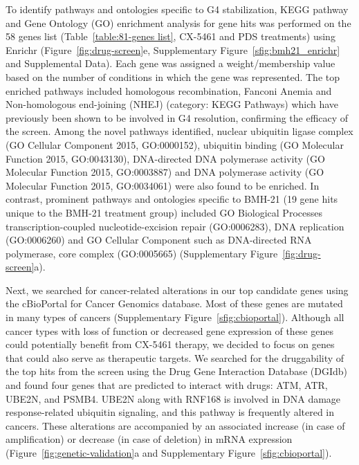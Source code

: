 To identify pathways and ontologies specific to G4 stabilization, KEGG pathway and Gene Ontology (GO) enrichment analysis for gene hits was performed on the 58 genes list (Table~\ref{table:81-genes list}, CX-5461 and PDS treatments) using Enrichr (Figure~\ref{fig:drug-screen}e, Supplementary Figure~\ref{sfig:bmh21_enrichr} and Supplemental Data)\cite{Chen2013,Kuleshov2016}. 
Each gene was assigned a weight/membership value based on the number of conditions in which the gene was represented. 
The top enriched pathways included homologous recombination, Fanconi Anemia  and Non-homologous end-joining (NHEJ) (category: KEGG Pathways) which have previously been shown to be involved in G4 resolution\cite{Sarkies2012,Piazza2010a,Paeschke2011a,Paeschke2013,Jimeno2018,Mendoza2016a,Eddy2014,Zimmer2015,Xu2017}, confirming the efficacy of the screen. 
Among the novel pathways identified, nuclear ubiquitin ligase complex (GO Cellular Component 2015, GO:0000152), ubiquitin binding (GO Molecular Function 2015, GO:0043130), DNA-directed DNA polymerase activity (GO Molecular Function 2015, GO:0003887) and DNA polymerase activity (GO Molecular Function 2015, GO:0034061) were also found to be enriched.
In contrast, prominent pathways and ontologies specific to BMH-21 (19 gene hits unique to the BMH-21 treatment group) included GO Biological Processes transcription-coupled nucleotide-excision repair (GO:0006283), DNA replication (GO:0006260) and GO Cellular Component such as DNA-directed RNA polymerase, core complex (GO:0005665) (Supplementary Figure~\ref{fig:drug-screen}a). 

Next, we searched for cancer-related alterations in our top candidate genes using the cBioPortal for Cancer Genomics database\cite{Cerami2012,Gao2013}. 
Most of these genes are mutated in many types of cancers (Supplementary Figure~\ref{sfig:cbioportal}). 
Although all cancer types with loss of function or decreased gene expression of these genes could potentially benefit from CX-5461 therapy, we decided to focus on genes that could also serve as therapeutic targets. 
We searched for the druggability of the top hits from the screen using the Drug Gene Interaction Database (DGIdb) and found four genes that are predicted to interact with drugs: ATM, ATR, UBE2N, and PSMB4. 
UBE2N along with RNF168 is involved in DNA damage response-related ubiquitin signaling, and this pathway is frequently altered in cancers. 
These alterations are accompanied by an associated increase (in case of amplification) or decrease (in case of deletion) in mRNA expression (Figure~\ref{fig:genetic-validation}a and Supplementary Figure~\ref{sfig:cbioportal}).


